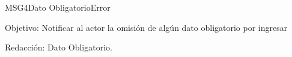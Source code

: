 \begin{mensaje}{MSG4}{Dato Obligatorio}{Error}
	\item [Objetivo:] Notificar al actor la omisión de algún dato obligatorio por ingresar
	\item[Redacción:] Dato Obligatorio.
\end{mensaje}
